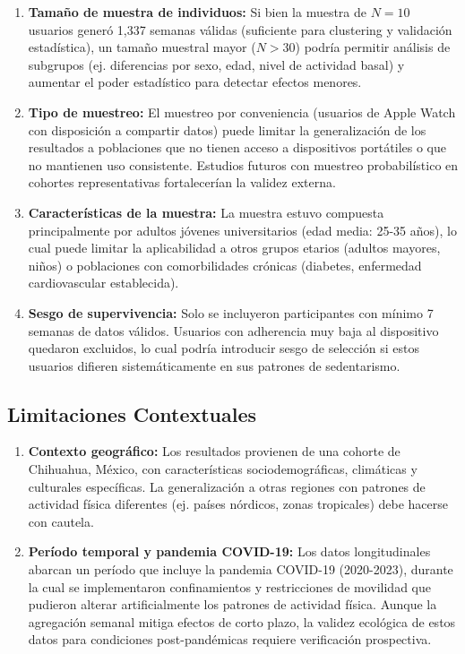 \begin{enumerate}
    \item \textbf{Tamaño de muestra de individuos:} Si bien la muestra de $N=10$ usuarios generó 1,337 semanas válidas (suficiente para clustering y validación estadística), un tamaño muestral mayor ($N > 30$) podría permitir análisis de subgrupos (ej. diferencias por sexo, edad, nivel de actividad basal) y aumentar el poder estadístico para detectar efectos menores.
    
    \item \textbf{Tipo de muestreo:} El muestreo por conveniencia (usuarios de Apple Watch con disposición a compartir datos) puede limitar la generalización de los resultados a poblaciones que no tienen acceso a dispositivos portátiles o que no mantienen uso consistente. Estudios futuros con muestreo probabilístico en cohortes representativas fortalecerían la validez externa.
    
    \item \textbf{Características de la muestra:} La muestra estuvo compuesta principalmente por adultos jóvenes universitarios (edad media: 25-35 años), lo cual puede limitar la aplicabilidad a otros grupos etarios (adultos mayores, niños) o poblaciones con comorbilidades crónicas (diabetes, enfermedad cardiovascular establecida).
    
    \item \textbf{Sesgo de supervivencia:} Solo se incluyeron participantes con mínimo 7 semanas de datos válidos. Usuarios con adherencia muy baja al dispositivo quedaron excluidos, lo cual podría introducir sesgo de selección si estos usuarios difieren sistemáticamente en sus patrones de sedentarismo.
\end{enumerate}

\subsection{Limitaciones Contextuales}
\label{subsec:limitaciones_contextuales}

\begin{enumerate}
    \item \textbf{Contexto geográfico:} Los resultados provienen de una cohorte de Chihuahua, México, con características sociodemográficas, climáticas y culturales específicas. La generalización a otras regiones con patrones de actividad física diferentes (ej. países nórdicos, zonas tropicales) debe hacerse con cautela.
    
    \item \textbf{Período temporal y pandemia COVID-19:} Los datos longitudinales abarcan un período que incluye la pandemia COVID-19 (2020-2023), durante la cual se implementaron confinamientos y restricciones de movilidad que pudieron alterar artificialmente los patrones de actividad física. Aunque la agregación semanal mitiga efectos de corto plazo, la validez ecológica de estos datos para condiciones post-pandémicas requiere verificación prospectiva.
\end{enumerate}

